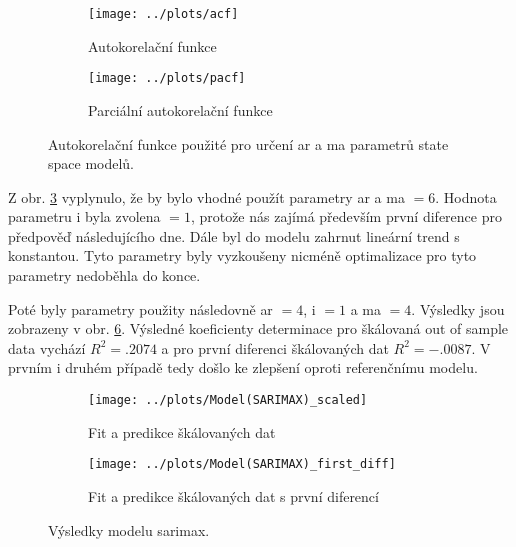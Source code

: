 \documentclass[a4paper,12pt, czech]{article}
\begin{document}
\begin{figure}[htb]
	\begin{subfigure}[t]{1\linewidth}
		\centering
		\texttt{[image: ../plots/acf]}
		\caption{Autokorelační funkce}
		\label{fig:acf}
	\end{subfigure}
	\begin{subfigure}[t]{1\linewidth}
		\centering
		\texttt{[image: ../plots/pacf]}
		\caption{Parciální autokorelační funkce}
		\label{fig:pacf}
	\end{subfigure}
	\caption{Autokorelační funkce použité pro určení \gls{ar} a \gls{ma} parametrů state space modelů.}\label{fig:auto_func}
\end{figure}

Z obr. \ref{fig:auto_func} vyplynulo, že by bylo vhodné použít parametry \gls{ar} a \gls{ma} $= 6$.
Hodnota parametru \gls{i} byla zvolena $= 1$, protože nás zajímá především první diference pro předpověď následujícího dne.
Dále byl do modelu zahrnut lineární trend s konstantou.
Tyto parametry byly vyzkoušeny nicméně optimalizace pro tyto parametry nedoběhla do konce.

Poté byly parametry použity následovně \gls{ar} $= 4$, \gls{i} $= 1$ a \gls{ma} $= 4$.
Výsledky jsou zobrazeny v obr. \ref{fig:sarimax}.
Výsledné koeficienty determinace pro škálovaná out of sample data vychází $R^2=\num{.2074}$ a pro první diferenci škálovaných dat $R^2=\num{-.0087}$.
V prvním i druhém případě tedy došlo ke zlepšení oproti referenčnímu modelu.

\begin{figure}[htb]
	\begin{subfigure}[t]{.5\linewidth}
		\centering
		\texttt{[image: ../plots/Model(SARIMAX)\_scaled]}
		\caption{Fit a predikce škálovaných dat}
		\label{fig:sarimax_scaled}
	\end{subfigure}
	\begin{subfigure}[t]{.5\linewidth}
		\centering
		\texttt{[image: ../plots/Model(SARIMAX)\_first\_diff]}
		\caption{Fit a predikce škálovaných dat s první diferencí}
		\label{fig:sarimax_fd}
	\end{subfigure}
	\caption{Výsledky modelu \gls{sarimax}.}\label{fig:sarimax}
\end{figure}


\clearpage

\subsection{}
\end{document}
